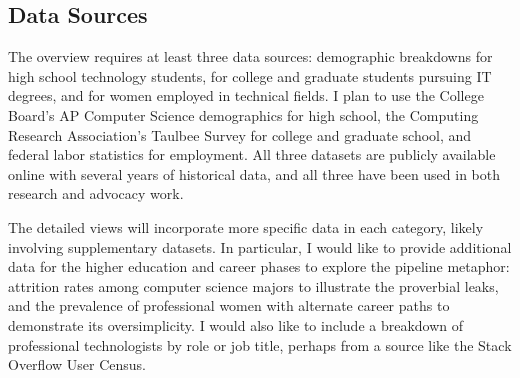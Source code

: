 \subsection{Data Sources}
The overview requires at least three data sources: demographic breakdowns for high school technology students, for college and graduate students pursuing IT degrees, and for women employed in technical fields. I plan to use the College Board’s AP Computer Science demographics for high school, the Computing Research Association’s Taulbee Survey for college and graduate school, and federal labor statistics for employment. All three datasets are publicly available online with several years of historical data, and all three have been used in both research and advocacy work.

The detailed views will incorporate more specific data in each category, likely involving supplementary datasets. In particular, I would like to provide additional data for the higher education and career phases to explore the pipeline metaphor: attrition rates among computer science majors to illustrate the proverbial leaks, and the prevalence of professional women with alternate career paths to demonstrate its oversimplicity. I would also like to include a breakdown of professional technologists by role or job title, perhaps from a source like the Stack Overflow User Census.
